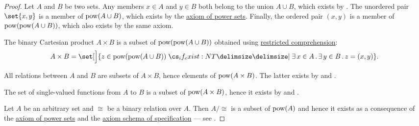 \begin{proof}
   Let \( A \) and \( B \) be two sets. Any members \( x \in A \) and \( y \in B \) both belong to the union \( A \cup B \), which exists by . The unordered pair \( \set{ x, y } \) is a member of \( \operatorname{pow}(A \cup B) \), which exists by the \hyperref[def:zfc/power_set]{axiom of power sets}. Finally, the ordered pair \( (x, y) \) is a member of \( \operatorname{pow}(\operatorname{pow}(A \cup B)) \), which also exists by the same axiom.

  The binary Cartesian product \( A \times B \) is a subset of \( \operatorname{pow}(\operatorname{pow}(A \cup B)) \) obtained using \hyperref[def:zfc/specification]{restricted comprehension}:
  \begin{equation*}
    A \times B = \set[\Big]{ z \in \pow(\pow(A \cup B)) \given* \qexists {x \in A} \qexists {y \in B} z = (x, y) }.
  \end{equation*}

   All relations between \( A \) and \( B \) are subsets of \( A \times B \), hence elements of \( \operatorname{pow}(A \times B) \). The latter exists by  and .

   The set of single-valued functions from \( A \) to \( B \) is a subset of \( \operatorname{pow}(A \times B) \), hence it exists by  and .

   Let \( A \) be an arbitrary set and \( \cong \) be a binary relation over \( A \). Then \( A / {\cong} \) is a subset of \( \operatorname{pow}(A) \) and hence it exists as a consequence of the \hyperref[def:zfc/power_set]{axiom of power sets} and the \hyperref[def:zfc/specification]{axiom schema of specification} --- see .
\end{proof}

